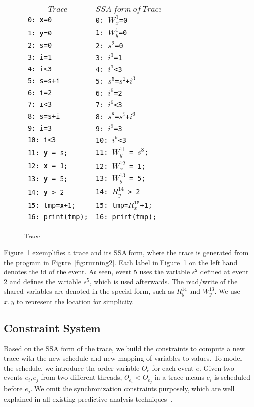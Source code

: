  
\begin{figure}
\centering
\begin{tabular}{l|l}
\hline
\multicolumn{1}{c}{$Trace$} & \multicolumn{1}{c}{$SSA \ form \ of\   Trace$} \\
\hline
{\tt 0: {\bf x}=0} &  {\tt 0: $W^0_x$=0}    \\
{\tt 1: {\bf y}=0} &   {\tt 1: $W^1_y$=0}   \\
{\tt 2: s=0} &  {\tt 2: $s^2$=0}   \\
{\tt 3: i=1} &     {\tt 3: $i^3$=1}   \\
{\tt 4: i<3} &    {\tt 4: $i^3$<3} \\
{\tt 5: s=s+i} & {\tt 5: $s^5$=$s^2$+$i^3$}   \\
{\tt 6: i=2} &       {\tt 6: $i^6$=2}  \\
{\tt 7: i<3} &      {\tt 7: $i^6$<3}  \\
{\tt 8: s=s+i} &  {\tt 8: $s^8$=$s^5$+$i^6$}  \\
{\tt 9: i=3} &     {\tt 9: $i^9$=3}  \\
{\tt 10: i<3} &    {\tt 10: $i^9$<3}  \\
{\tt 11: {\bf y} = s;} &  {\tt 11: $W^{11}_y$ = $s^8$;}  \\
{\tt 12: {\bf x} = 1;} &    {\tt 12: $W^{12}_x$ = 1;}   \\
{\tt 13: {\bf y} = 5;} &    {\tt 13: $W^{13}_y$ = 5;}  \\
{\tt 14: {\bf y} > 2}  &    {\tt 14: $R^{14}_y$ > 2} \\
{\tt 15: tmp={\bf x}+1;}  & {\tt 15: tmp=$R^{15}_x$+1;}   \\	
{\tt 16: print(tmp);} &  {\tt 16: print(tmp);}  \\
\end{tabular}
\caption{Trace}
\label{fig:t4running2}
\end{figure}

Figure~\ref{fig:t4running2} exemplifies a trace and its SSA form, where the trace is generated from the program in Figure~\ref{fig:running2}.
Each label in  Figure~\ref{fig:t4running2} on the left hand denotes the id of the event. As seen, event 5 uses the variable $s^2$ defined at event 2 and defines the variable $s^5$, which is used afterwards. The read/write of the shared variables are denoted in the special form, such as $R^{14}_y$ and $W^{13}_y$. We use $x, y$ to represent the location for simplicity.



\subsection{Constraint System}
Based on the SSA form of the trace, we build the constraints to compute a new trace with the new schedule and new mapping of variables to values.
To model the schedule, we introduce the order variable $O_{e}$ for each event $e$. Given two events $e_i, e_j$ from two different threads, $O_{e_i}<O_{e_j}$ in a trace means $e_i$ is scheduled before $e_j$. We omit the synchronization constraints purposely, which are well explained in all existing predictive analysis techniques~\cite{yannis, pldi14}.

